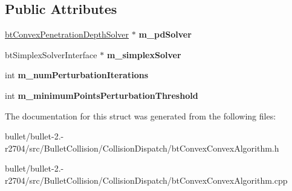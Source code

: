 \subsection*{Public Attributes}
\begin{DoxyCompactItemize}
\item 
\hypertarget{structbt_convex_convex_algorithm_1_1_create_func_aa6454c683da51e4f352b9411f52b272e}{\hyperlink{classbt_convex_penetration_depth_solver}{bt\+Convex\+Penetration\+Depth\+Solver} $\ast$ {\bfseries m\+\_\+pd\+Solver}}\label{structbt_convex_convex_algorithm_1_1_create_func_aa6454c683da51e4f352b9411f52b272e}

\item 
\hypertarget{structbt_convex_convex_algorithm_1_1_create_func_ad9efef4cbe777f2f8a8e136b2c3a49a6}{bt\+Simplex\+Solver\+Interface $\ast$ {\bfseries m\+\_\+simplex\+Solver}}\label{structbt_convex_convex_algorithm_1_1_create_func_ad9efef4cbe777f2f8a8e136b2c3a49a6}

\item 
\hypertarget{structbt_convex_convex_algorithm_1_1_create_func_a24eea415bbe847cff58abeeb5755eb8b}{int {\bfseries m\+\_\+num\+Perturbation\+Iterations}}\label{structbt_convex_convex_algorithm_1_1_create_func_a24eea415bbe847cff58abeeb5755eb8b}

\item 
\hypertarget{structbt_convex_convex_algorithm_1_1_create_func_aa5c11136faeea1f82ab05a16014d4278}{int {\bfseries m\+\_\+minimum\+Points\+Perturbation\+Threshold}}\label{structbt_convex_convex_algorithm_1_1_create_func_aa5c11136faeea1f82ab05a16014d4278}

\end{DoxyCompactItemize}


The documentation for this struct was generated from the following files\+:\begin{DoxyCompactItemize}
\item 
bullet/bullet-\/2.-\/r2704/src/\+Bullet\+Collision/\+Collision\+Dispatch/bt\+Convex\+Convex\+Algorithm.\+h\item 
bullet/bullet-\/2.-\/r2704/src/\+Bullet\+Collision/\+Collision\+Dispatch/bt\+Convex\+Convex\+Algorithm.\+cpp\end{DoxyCompactItemize}
